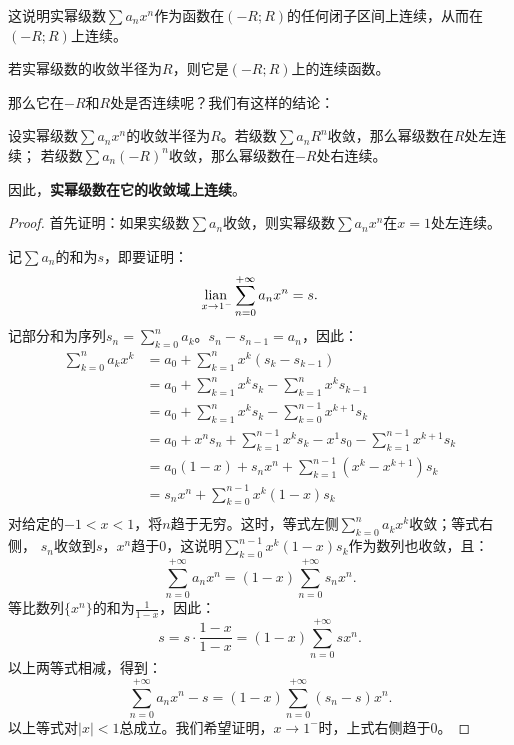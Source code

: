 \documentclass[12pt,UTF8,fontset=none]{ctexbook}
\begin{document}
\begin{appendix}
这说明实幂级数$\sum a_n x^n$作为函数在$(-R;R)$的任何闭子区间上连续，从而在$(-R;R)$上连续。

\begin{tm}\label{tm:c-4-0}
    若实幂级数的收敛半径为$R$，则它是$(-R;R)$上的连续函数。
\end{tm}

那么它在$-R$和$R$处是否连续呢？我们有这样的结论：

\begin{tm}\label{tm:c-4-10}
    设实幂级数$\sum a_n x^n$的收敛半径为$R$。若级数$\sum a_n R^n$收敛，那么幂级数在$R$处左连续；
    若级数$\sum a_n (-R)^n$收敛，那么幂级数在$-R$处右连续。
\end{tm}

因此，\textbf{实幂级数在它的收敛域上连续}。

\begin{proof}
    首先证明：如果实级数$\sum a_n$收敛，则实幂级数$\sum a_n x^n$在$x = 1$处左连续。

    记$\sum a_n$的和为$s$，即要证明：
    $$ \underset{x\to 1^-}{\operatorname{lian}\,} \sum_{n=0}^{+\infty}a_n x^n = s. $$
    记部分和为序列$ s_n = \sum_{k=0}^{n} a_k$。$s_{n} - s_{n-1} = a_n$，因此：
    \begin{align*}
        \sum_{k=0}^{n} a_k x^k &= a_0 + \sum_{k=1}^{n} x^k (s_k - s_{k-1}) \\
        &= a_0 + \sum_{k=1}^{n} x^k s_k - \sum_{k=1}^{n} x^k s_{k-1} \\
        &= a_0 + \sum_{k=1}^{n} x^k s_k - \sum_{k=0}^{n-1} x^{k+1} s_k \\
        &= a_0 + x^n s_n + \sum_{k=1}^{n-1} x^k s_k - x^1 s_0 - \sum_{k=1}^{n-1} x^{k+1} s_k \\
        &= a_0(1 - x) + s_n x^n + \sum_{k=1}^{n-1} (x^k - x^{k+1}) s_k \\
        &= s_n x^n + \sum_{k=0}^{n-1} x^k(1 - x) s_k \\
    \end{align*}
    对给定的$-1<x<1$，将$n$趋于无穷。这时，等式左侧$\sum_{k=0}^{n} a_k x^k$收敛；等式右侧，
    $s_n$收敛到$s$，$x^n$趋于$0$，这说明$\sum_{k=0}^{n-1} x^k(1 - x) s_k$作为数列也收敛，且：
    $$ \sum_{n=0}^{+\infty}a_n x^n = (1 - x)\sum_{n=0}^{+\infty}s_n x^n.$$
    等比数列$\{x^n\}$的和为$\frac{1}{1 - x}$，因此：
    $$ s = s \cdot \frac{1 - x}{1 - x} = (1 - x)\sum_{n=0}^{+\infty} s x^n. $$
    以上两等式相减，得到：
    $$ \sum_{n=0}^{+\infty}a_n x^n - s = (1 - x)\sum_{n=0}^{+\infty}(s_n - s) x^n.$$
    以上等式对$|x|<1$总成立。我们希望证明，$x\to 1^-$时，上式右侧趋于$0$。


\end{proof}
\end{appendix}
\end{document}
